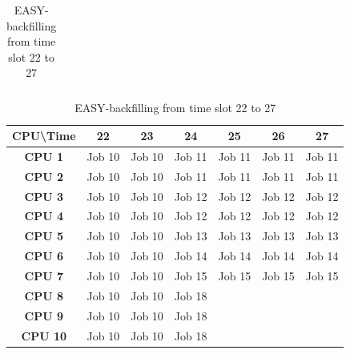 \documentclass[11pt]{article}
\begin{document}
\begin{table}[]
\begin{tabular}{|c|c|c|c|c|c|c|c|c|c|c|}
\end{tabular}
\caption{\label{EASY12}EASY-backfilling from time slot 12 to 21}
\vspace{1cm}
\begin{tabular}{|c|c|c|c|c|c|c|}
\hline
\textbf{CPU\textbackslash{}Time} & \textbf{22} & \textbf{23} & \textbf{24} & \textbf{25} & \textbf{26} & \textbf{27} \\ \hline
\textbf{CPU 1}                   & Job 10      & Job 10      & Job 11      & Job 11      & Job 11      & Job 11      \\ \hline
\textbf{CPU 2}                   & Job 10      & Job 10      & Job 11      & Job 11      & Job 11      & Job 11      \\ \hline
\textbf{CPU 3}                   & Job 10      & Job 10      & Job 12      & Job 12      & Job 12      & Job 12      \\ \hline
\textbf{CPU 4}                   & Job 10      & Job 10      & Job 12      & Job 12      & Job 12      & Job 12      \\ \hline
\textbf{CPU 5}                   & Job 10      & Job 10      & Job 13      & Job 13      & Job 13      & Job 13      \\ \hline
\textbf{CPU 6}                   & Job 10      & Job 10      & Job 14      & Job 14      & Job 14      & Job 14      \\ \hline
\textbf{CPU 7}                   & Job 10      & Job 10      & Job 15      & Job 15      & Job 15      & Job 15      \\ \hline
\textbf{CPU 8}                   & Job 10      & Job 10      & Job 18      &             &             &             \\ \hline
\textbf{CPU 9}                   & Job 10      & Job 10      & Job 18      &             &             &             \\ \hline
\textbf{CPU 10}                  & Job 10      & Job 10      & Job 18      &             &             &             \\ \hline
\end{tabular}
\caption{\label{EASY22}EASY-backfilling from time slot 22 to 27}
\end{table}
\end{document}
